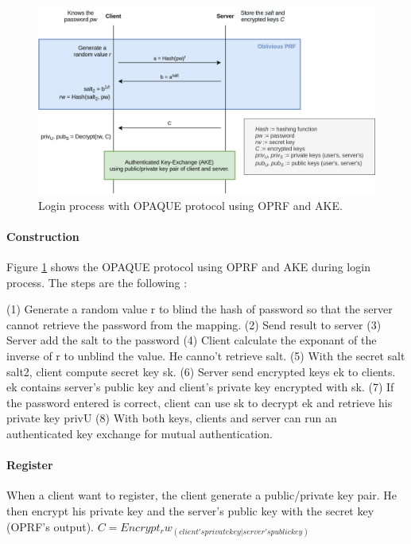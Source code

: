 \documentclass[../report.tex]{subfiles}
\begin{document}
\begin{figure}[h]
 \centering
 \includegraphics[width=\textwidth]{OPAQUE.png}
 \caption{Login process with OPAQUE protocol using OPRF and AKE.}
 \label{fig:OPAQUE_AKE}
\end{figure}




\paragraph{Construction}

Figure \ref{fig:OPAQUE_AKE} shows the OPAQUE protocol using OPRF and AKE during login process.
The steps are the following :

(1) Generate a random value r to blind the hash of password so that the server cannot retrieve the password from the mapping.
(2) Send result to server
(3) Server add the salt to the password
(4) Client calculate the exponant of the inverse of r to unblind the value. He canno't retrieve salt.
(5) With the secret salt salt2, client compute secret key sk.
(6) Server send encrypted keys ek to clients. ek contains server's public key and client's private key encrypted with sk.
(7) If the password entered is correct, client can use sk to decrypt ek and retrieve his private key privU
(8) With both keys, clients and server can run an authenticated key exchange for mutual authentication.


\paragraph{Register}
When a client want to register, the client generate a public/private key pair. He then encrypt his private key and the server's public key with the secret key (OPRF's output).
$C = Encrypt_rw_(client's private key | server's public key)$
\end{document}

